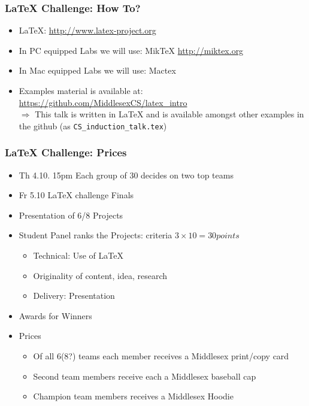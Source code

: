 \documentclass{beamer}
\begin{document}
\begin{frame}
\frametitle{LaTeX Challenge: How To?}
\begin{itemize}
\item LaTeX: \url{http://www.latex-project.org}
\item In PC equipped Labs we will use: MikTeX \url{http://miktex.org}
\item In Mac equipped Labs we will use: Mactex 
\item Examples material is available at: 
\url{https://github.com/MiddlesexCS/latex_intro} \\
\alert{$\Rightarrow$} This talk is written in LaTeX
  and is available amongst other examples in the github (as \texttt{CS\_induction\_talk.tex})
\end{itemize}
\end{frame}

\begin{frame}
\frametitle{LaTeX Challenge: Prices}
\begin{itemize}
\item \alert{Th 4.10. 15pm} Each group of 30 decides on two top teams
\item \alert{Fr 5.10} LaTeX challenge Finals
\item Presentation of 6/8 Projects
\item Student Panel ranks the Projects: criteria $3\times 10 = 30 points$
\begin{itemize}
\item Technical: Use of LaTeX
\item Originality of content, idea, research
\item Delivery: Presentation
\end{itemize}
\item Awards for Winners
\item \alert{Prices}
\begin{itemize}
\item<1-3> Of all 6(8?) teams each member receives a Middlesex print/copy card
\item<2-3> Second team members receive each a Middlesex baseball cap
\item<3> Champion team members receives a Middlesex Hoodie
\end{itemize}
\end{itemize}
\end{frame}
\end{document}
